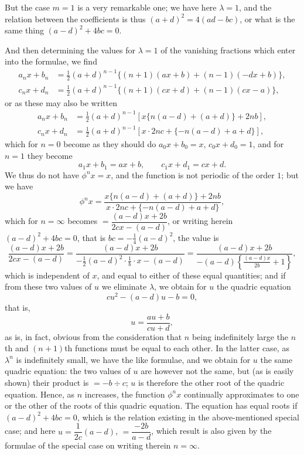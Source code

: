 \documentclass[11pt,a4paper]{book}
\begin{document}
But the case $m=1$ is a very remarkable one; we have here $\lambda = 1$, and
the relation between the coefficients is thus $(a+d)^2 = 4(ad-bc)$, or what is
the same thing $(a-d)^2 + 4bc = 0$.

And then determining the values for $\lambda = 1$ of the vanishing fractions
which enter into the formulae, we find
\begin{align*}
a_n x + b_n &= \tfrac{1}{2}(a+d)^{n-1} \{(n+1)(ax+b) + (n-1)(-dx+b)\}, \\
c_n x + d_n &= \tfrac{1}{2}(a+d)^{n-1} \{(n+1)(cx+d) + (n-1)(cx-a)\},
\end{align*}
or as these may also be written
\begin{align*}
a_n x + b_n &= \tfrac{1}{2}(a+d)^{n-1} [x\{n(a-d) + (a+d)\} + 2nb], \\
c_n x + d_n &= \tfrac{1}{2}(a+d)^{n-1} [x \cdot 2nc + \{-n(a-d) + a + d\}],
\end{align*}
which for $n=0$ become as they should do $a_0 x + b_0 = x$,
$c_0 x + d_0 = 1$, and for $n=1$ they become
%
\[
a_1 x + b_1 = ax + b, \qquad c_1 x + d_1 = cx + d.
\]
%
We thus do not have $\phi^n x = x$, and the function is not periodic of
the order $1$; but we have
%
\[
\phi^n x = \frac{x\{n(a-d) + (a+d)\} + 2nb}
{x \cdot 2nc + \{-n(a-d) + a + d\}},
\]
%
which for $n = \infty$ becomes $= \dfrac{(a-d)x + 2b}{2cx - (a-d)}$, or writing herein
$(a-d)^2 + 4bc = 0$, that is $bc = -\tfrac{1}{4}(a-d)^2$, the value is
%
\[
\frac{(a-d)x + 2b}{2cx - (a-d)} = \frac{(a-d)x + 2b}{-\tfrac{1}{2}(a-d)^2 \cdot \frac{1}{b} \cdot x - (a-d)}
= \frac{(a-d)x + 2b}{-(a-d)\left\{\frac{(a-d)x}{2b} + 1\right\}},
\]
%
which is independent of $x$, and equal to either of these equal quantities;
and if from these two values of $u$ we eliminate $\lambda$, we obtain for $u$ the
quadric equation
%
\[
cu^2 - (a-d)u - b = 0,
\]
%
that is,
%
\[
u = \frac{au+b}{cu+d},\]
%
as is, in fact, obvious from the consideration that $n$ being indefinitely large
the $n$th and $(n+1)$th functions must be equal to each other. In the latter
case, as $\lambda^n$ is indefinitely small, we have the like formulae, and we obtain
for $u$ the same quadric equation: the two values of $u$ are however not the
same, but (as is easily shown) their product is $= -b \div c$; $u$ is therefore
the other root of the quadric equation. Hence, as $n$ increases, the function
$\phi^n x$ continually approximates to one or the other of the roots of this quadric
equation. The equation has equal roots if $(a-d)^2 + 4bc = 0$, which is
the relation existing in the above-mentioned special case; and here
$u = \dfrac{1}{2c}(a-d)$, $= \dfrac{-2b}{a-d}$, which result is also given by the formulae
of the special case on writing therein $n = \infty$.
\end{document}
